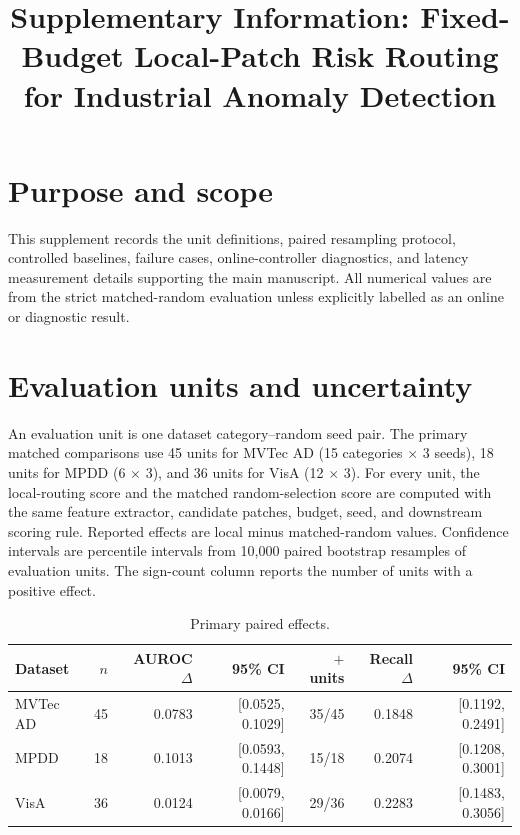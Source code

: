 \documentclass[pdflatex,sn-vancouver-num]{sn-jnl}
\begin{document}
\title[Supplementary Information]{Supplementary Information: Fixed-Budget Local-Patch Risk Routing for Industrial Anomaly Detection}
\author*[1]{ }
\author[2]{ }

\maketitle

\section{Purpose and scope}
This supplement records the unit definitions, paired resampling protocol, controlled baselines, failure cases, online-controller diagnostics, and latency measurement details supporting the main manuscript. All numerical values are from the strict matched-random evaluation unless explicitly labelled as an online or diagnostic result.

\section{Evaluation units and uncertainty}
An evaluation unit is one dataset category--random seed pair. The primary matched comparisons use 45 units for MVTec AD (15 categories $\times$ 3 seeds), 18 units for MPDD (6 $\times$ 3), and 36 units for VisA (12 $\times$ 3). For every unit, the local-routing score and the matched random-selection score are computed with the same feature extractor, candidate patches, budget, seed, and downstream scoring rule. Reported effects are local minus matched-random values. Confidence intervals are percentile intervals from 10,000 paired bootstrap resamples of evaluation units. The sign-count column reports the number of units with a positive effect.

\begin{table}[ht]
\caption{Primary paired effects.}
\label{tab:primary}
\begin{tabularx}{\textwidth}{lrrrrrr}
\toprule
Dataset & $n$ & AUROC $\Delta$ & 95\% CI & $+$ units & Recall $\Delta$ & 95\% CI \\
\midrule
MVTec AD & 45 & 0.0783 & [0.0525, 0.1029] & 35/45 & 0.1848 & [0.1192, 0.2491] \\
MPDD & 18 & 0.1013 & [0.0593, 0.1448] & 15/18 & 0.2074 & [0.1208, 0.3001] \\
VisA & 36 & 0.0124 & [0.0079, 0.0166] & 29/36 & 0.2283 & [0.1483, 0.3056] \\
\bottomrule
\end{tabularx}
\end{table}
\end{document}
